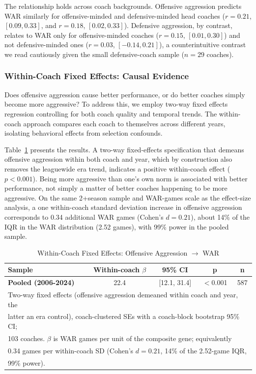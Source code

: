 \documentclass[USenglish]{article}
\theoremstyle{dgthm}
\theoremstyle{dgdef}
\begin{document}
The relationship holds across coach backgrounds. Offensive aggression predicts WAR similarly for offensive-minded and defensive-minded head coaches ($r=0.21$, $[0.09, 0.33]$, and $r=0.18$, $[0.02, 0.33]$). Defensive aggression, by contrast, relates to WAR only for offensive-minded coaches ($r=0.15$, $[0.01, 0.30]$) and not defensive-minded ones ($r=0.03$, $[-0.14, 0.21]$), a counterintuitive contrast we read cautiously given the small defensive-coach sample ($n=29$ coaches).

\subsubsection{Within-Coach Fixed Effects: Causal Evidence}

Does offensive aggression cause better performance, or do better coaches simply become more aggressive? To address this, we employ two-way fixed effects regression controlling for both coach quality and temporal trends. The within-coach approach compares each coach to themselves across different years, isolating behavioral effects from selection confounds.

Table~\ref{tab:fixed_effects} presents the results. A two-way fixed-effects specification that demeans offensive aggression within both coach and year, which by construction also removes the leaguewide era trend, indicates a positive within-coach effect ($p<0.001$). Being more aggressive than one's own norm is associated with better performance, not simply a matter of better coaches happening to be more aggressive. On the same 2+season sample and WAR-games scale as the effect-size analysis, a one within-coach standard deviation increase in offensive aggression corresponds to 0.34 additional WAR games (Cohen's $d=0.21$), about 14\% of the IQR in the WAR distribution (2.52 games), with 99\% power in the pooled sample.

\begin{table}[H]
\caption{Within-Coach Fixed Effects: Offensive Aggression $\rightarrow$ WAR}
\label{tab:fixed_effects}
\begin{tabular}{lcccc}
\toprule
\textbf{Sample} & \textbf{Within-coach $\beta$} & \textbf{95\% CI} & \textbf{p} & \textbf{n} \\
\midrule
\textbf{Pooled (2006-2024)} & 22.4 & [12.1, 31.4] & $<$0.001 & 587 \\
\midrule
\multicolumn{5}{l}{\small Two-way fixed effects (offensive aggression demeaned within coach and year, the}\\
\multicolumn{5}{l}{\small latter an era control), coach-clustered SEs with a coach-block bootstrap 95\% CI;}\\
\multicolumn{5}{l}{\small 103 coaches. $\beta$ is WAR games per unit of the composite gene; equivalently}\\
\multicolumn{5}{l}{\small 0.34 games per within-coach SD (Cohen's $d=0.21$, 14\% of the 2.52-game IQR,}\\
\multicolumn{5}{l}{\small 99\% power).}\\
\bottomrule
\end{tabular}
\end{table}
\end{document}
